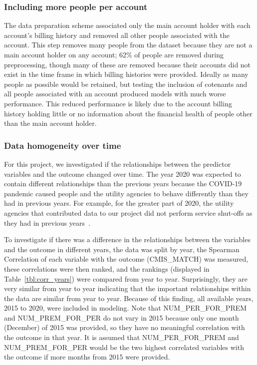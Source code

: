 \documentclass[10pt,letterpaper]{article}
\begin{document}
\subsubsection*{Including more people per account}
The data preparation scheme associated only the main account holder with each account's billing history and removed all other people associated with the account. This step removes many people from the dataset because they are not a main account holder on any account; 62\% of people are removed during preprocessing, though many of these are removed because their accounts did not exist in the time frame in which billing histories were provided. Ideally as many people as possible would be retained, but testing the inclusion of cotenants and all people associated with an account produced models with much worse performance. This reduced performance is likely due to the account billing history holding little or no information about the financial health of people other than the main account holder.

\subsubsection*{Data homogeneity over time}
For this project, we investigated if the relationships between the predictor variables and the outcome changed over time. The year 2020 was expected to contain different relationships than the previous years because the COVID-19 pandemic caused people and the utility agencies to behave differently than they had in previous years. For example, for the greater part of 2020, the utility agencies that contributed data to our project did not perform service shut-offs as they had in previous years~\cite{white2020utilities}. 

To investigate if there was a difference in the relationships between the variables and the outcome in different years, the data was split by year, the Spearman Correlation of each variable with the outcome (CMIS\_MATCH) was measured, these correlations were then ranked, and the rankings (displayed in Table~\ref{tbl:corr_years}) were compared from year to year. Surprisingly, they are very similar from year to year indicating that the important relationships within the data are similar from year to year. Because of this finding, all available years, 2015 to 2020, were included in modeling. Note that NUM\_PER\_FOR\_PREM and NUM\_PREM\_FOR\_PER do not vary in 2015 because only one month (December) of 2015 was provided, so they have no meaningful correlation with the outcome in that year. It is assumed that NUM\_PER\_FOR\_PREM and NUM\_PREM\_FOR\_PER would be the two highest correlated variables with the outcome if more months from 2015 were provided.
\end{document}
